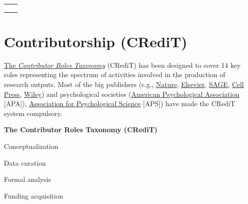 \documentclass[
]{book}
\theoremstyle{definition}
\theoremstyle{definition}
\theoremstyle{definition}
\theoremstyle{definition}
\theoremstyle{remark}
\begin{document}
\begin{table}
{\begin{tabular}[t]{ll}
\hspace{1em}\cellcolor[HTML]{FFDBDB}{} & \hspace{1em}\cellcolor[HTML]{FFDBDB}{R1.1. (meta)data are released with a clear and accessible data usage license}\\
\hspace{1em}\cellcolor[HTML]{FFDBDB}{} & \hspace{1em}\cellcolor[HTML]{FFDBDB}{R1.2. (meta)data are associated with detailed provenance}\\
\hspace{1em}\cellcolor[HTML]{FFDBDB}{} & \hspace{1em}\cellcolor[HTML]{FFDBDB}{R1.3. (meta)data meet domain-relevant community standards}\\
\bottomrule
\end{tabular}}
\end{table}

\hypertarget{contributorship-credit}{%
\section{Contributorship (CRediT)}\label{contributorship-credit}}

\href{https://credit.niso.org}{The \emph{Contributor Roles Taxonomy}} (CRediT) has been designed to cover 14 key roles representing the spectrum of activities involved in the production of research outputs. Most of the big publishers (e.g., \href{https://www.nature.com/nature-portfolio/editorial-policies/authorship}{Nature}, \href{https://www.elsevier.com/authors/policies-and-guidelines/credit-author-statement}{Elsevier}, \href{https://uk.sagepub.com/en-gb/eur/credit}{SAGE}, \href{https://www.cell.com/pb/assets/raw/shared/guidelines/CRediT-taxonomy.pdf}{Cell Press}, \href{https://authorservices.wiley.com/author-resources/Journal-Authors/open-access/credit.html}{Wiley}) and psychological societies (\href{https://www.apa.org/pubs/journals/resources/publishing-tips/giving-credit}{American Psychological Association} {[}APA{]}), \href{https://www.psychologicalscience.org/observer/fully-credited-making-publishing-more-equitable}{Association for Psychological Science} {[}APS{]}) have made the CRediT system compulsory.

\textbf{The Contributor Roles Taxonomy (CRediT)}

Conceptualization

Data curation

Formal analysis

Funding acquisition
\end{document}
